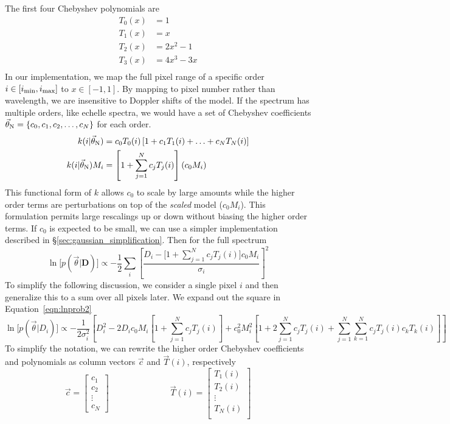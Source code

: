 \documentclass[preprint]{aastex} %
\newcommand{\vt}{\vec{\theta}}
\newcommand{\vN}{\vt_{\rm N}}
\newcommand{\vc}{\vec{c}}
\newcommand{\fMi}{M_i}
\newcommand{\fD}{ {\bm D}}
\newcommand{\fDi}{D_i}
\begin{document}
The first four Chebyshev polynomials are 
\begin{align*}
  T_0(x) &= 1\\
  T_1(x) &= x\\
  T_2(x) &= 2 x^2 - 1\\
  T_3(x) &= 4 x^3 - 3x\\
\end{align*}
In our implementation, we map the full pixel range of a specific order $i \in [i_{\rm min}, i_{\rm max}]$ to $x \in [-1, 1]$. By mapping to pixel number rather than wavelength, we are insensitive to Doppler shifts of the model. If the spectrum has multiple orders, like echelle spectra, we would have a set of Chebyshev coefficients $\vN = \{ c_0, c_1, c_2, \ldots, c_N \}$ for each order.
\begin{align}
  k(i | \vN) &= c_0 T_0(i) \left [1 + c_1 T_1(i) + \ldots + c_N T_N(i) \right ]\\
  k(i | \vN) \fMi &=  \left [1 + \sum^N_{j = 1} c_j T_j(i) \right ] (c_0 \fMi)\\
  \label{eqn:k_new}
\end{align}
This functional form of $k$ allows $c_0$ to scale by large amounts while the higher order terms are perturbations on top of the \emph{scaled} model ($c_0 \fMi$). This formulation permits large rescalings up or down without biasing the higher order terms. If $c_0$ is expected to be small, we can use a simpler implementation described in \S\ref{sec:gaussian_simplification}. Then for the full spectrum   
\begin{equation}
  \ln \bigl [p(\vt | \fD) \bigr] \propto - \frac{1}{2} \sum_i \left [\frac{\fDi - \bigl [1 + \sum^N_{j = 1} c_j T_j(i) \bigr ] c_0 \fMi }{\sigma_i} \right ]^2
  \label{eqn:lnprob2}
\end{equation}
To simplify the following discussion, we consider a single pixel $i$ and then generalize this to a sum over all pixels later. We expand out the square in Equation~\ref{eqn:lnprob2}
\begin{equation}
  \ln \bigl [p(\vt | \fDi) \bigr] \propto - \frac{1}{2 \sigma_i^2} \left [ \fDi^2 - 2 \fDi c_0 \fMi \left [1+ \sum_{j=1}^N c_j T_j(i) \right ]+ c_0^2 \fMi^2 \left [1 + 2 \sum_{j=1}^N c_j T_j(i) + \sum_{j=1}^N \sum_{k=1}^N c_j T_j(i) c_k T_k(i) \right ] \right ]
  \label{eqn:expanded}
 \end{equation}
To simplify the notation, we can rewrite the higher order Chebyshev coefficients and polynomials as column vectors $\vc$ and $\vec{T}(i)$, respectively
\begin{equation}
  \vc = 
  \begin{bmatrix}
    c_1\\
    c_2\\
    \vdots\\
    c_N
  \end{bmatrix}
  \hspace{3cm}
\vec{T}(i) = 
\begin{bmatrix}
T_1(i)\\
T_2(i)\\
\vdots\\
T_N(i)\\
\end{bmatrix}
\end{equation}
\end{document}
